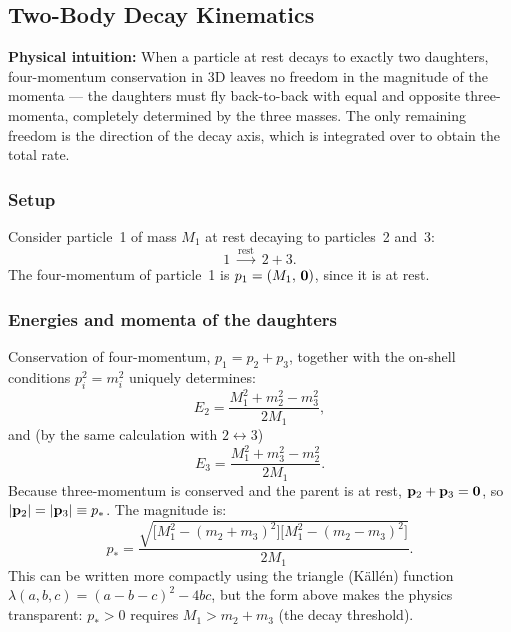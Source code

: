\documentclass[../main.tex]{subfiles}
\begin{document}
\subsection*{Two-Body Decay Kinematics}

\noindent\textbf{Physical intuition:} When a particle at rest decays to exactly two daughters, four-momentum conservation in 3D leaves no freedom in the magnitude of the momenta — the daughters must fly back-to-back with equal and opposite three-momenta, completely determined by the three masses.  The only remaining freedom is the direction of the decay axis, which is integrated over to obtain the total rate.

\subsubsection*{Setup}

Consider particle~1 of mass $M_1$ at rest decaying to particles~2 and~3:
\[
  1 \;\xrightarrow{\text{rest}}\; 2 + 3.
\]
The four-momentum of particle~1 is $p_1 = (M_1,\,\mathbf{0})$, since it is at rest.

\subsubsection*{Energies and momenta of the daughters}

Conservation of four-momentum, $p_1 = p_2 + p_3$, together with the on-shell conditions $p_i^2 = m_i^2$ uniquely determines:
\begin{equation}
  \boxed{E_2 = \frac{M_1^2 + m_2^2 - m_3^2}{2M_1},}
  \label{eq:lec07:E2}
\end{equation}
and (by the same calculation with $2 \leftrightarrow 3$)
\begin{equation}
  E_3 = \frac{M_1^2 + m_3^2 - m_2^2}{2M_1}.
  \label{eq:lec07:E3}
\end{equation}
Because three-momentum is conserved and the parent is at rest, $\mathbf{p}_2 + \mathbf{p}_3 = \mathbf{0}$, so $|\mathbf{p}_2| = |\mathbf{p}_3| \equiv p_*$.  The magnitude is:
\begin{equation}
  \boxed{
  p_* = \frac{\sqrt{
    \bigl[M_1^2 - (m_2+m_3)^2\bigr]\bigl[M_1^2 - (m_2-m_3)^2\bigr]
  }}{2M_1}.
  }
  \label{eq:lec07:pstar}
\end{equation}
This can be written more compactly using the triangle (Källén) function $\lambda(a,b,c)=(a-b-c)^2-4bc$, but the form above makes the physics transparent: $p_* > 0$ requires $M_1 > m_2 + m_3$ (the decay threshold).
\end{document}
